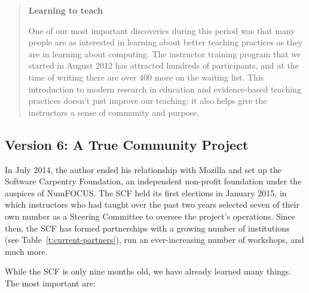 \documentclass[10pt,a4paper,twocolumn]{article}
\begin{document}
\begin{quote}
\textbf{Learning to teach}

One of our most important discoveries during this period was that many
people are as interested in learning about better teaching practices
as they are in learning about computing.  The instructor training
program that we started in August 2012 has attracted hundreds of
participants, and at the time of writing there are over 400 more on
the waiting list.  This introduction to modern research in education
and evidence-based teaching practices \cite{hlw2010} doesn't just
improve our teaching: it also helps give the instructors a sense of
community and purpose.

\end{quote}

\subsection*{Version 6: A True Community Project}

In July 2014, the author ended his relationship with Mozilla and set
up the Software Carpentry Foundation, an independent non-profit
foundation under the auspices of NumFOCUS.  The SCF held its first
elections in January 2015, in which instructors who had taught over
the past two years selected seven of their own number as a Steering
Committee to oversee the project's operations.  Since then, the SCF
has formed partnerships with a growing number of institutions (see
Table~\ref{t:current-partners}), run an ever-increasing number of
workshops, and much more.

While the SCF is only nine months old, we have already learned many
things.  The most important are:
\end{document}
